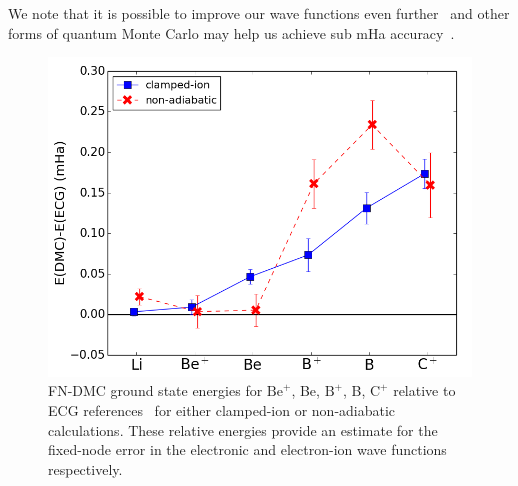 \documentclass[pra,superscriptaddress,groupedaddress,twocolumn]{revtex4}
\begin{document}
We note that it is possible to improve our wave functions even further~\cite{Morale_Bench,Clay_Bench} and other forms of quantum Monte Carlo may help us achieve sub mHa accuracy~\cite{Tubman_Release,Tubman_ACS}. %

\begin{figure}[h]
\centering
\includegraphics[scale=.4]{Figures/atom-ECG}
\caption{FN-DMC ground state energies for $\text{Be}^+$, Be, $\text{B}^+$, B, $\text{C}^+$ relative to ECG references~\cite{Stanke_Be,Puchalski_Be+,Bubin_BeH_noBO,Bubin_B,Bubin_B+,Bubin_C+} for either clamped-ion or non-adiabatic calculations. These relative energies provide an estimate for the fixed-node error in the electronic and electron-ion wave functions respectively.\label{fig:atom-ECG}}
\end{figure}
\end{document}
